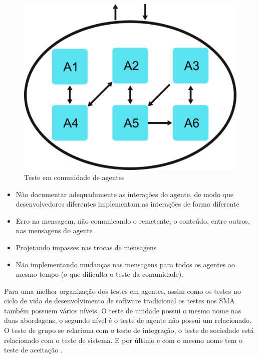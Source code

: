 \documentclass[dm,ppgcomp]{texfurg} %
\begin{document}
\begin{figure}[ht]
\centering
\includegraphics[scale=0.5]{imagens/agente_comunidade.png}
\caption{Teste em comunidade de agentes}
\label{comunity}
\end{figure}

\begin{itemize}
\item Não documentar adequadamente as interações do agente, de modo que desenvolvedores diferentes implementam as interações de forma diferente
\item Erro na mensagem, não comunicando o remetente, o conteúdo, entre outros, nas mensagens do agente
\item Projetando impasses nas trocas de mensagens
\item Não implementando mudanças nas mensagens para todos os agentes ao mesmo tempo (o que dificulta o teste da comunidade).
\end{itemize}

Para uma melhor organização dos testes em agentes, assim como os testes no ciclo de vida de desenvolvimento de software tradicional os testes nos SMA também possuem vários níveis. O teste de unidade possui o mesmo nome nas duas abordagens, o segundo nível é o teste de agente não possui um relacionado. O teste de  grupo se relaciona com o teste de integração, o teste de sociedade está relacionado com o teste de sistema. E por último e com o mesmo nome tem o teste de aceitação \cite{houhamdi2011multi}. 
\end{document}
